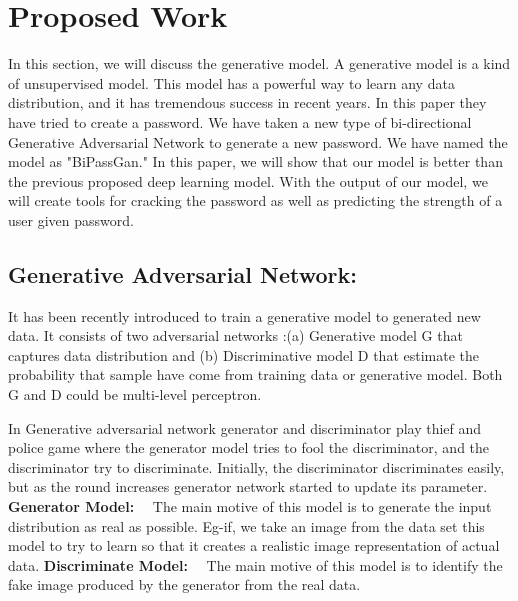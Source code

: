 \documentclass[runningheads]{llncs}
\begin{document}
\section{Proposed Work}
\newline
In this section, we will discuss the generative model. A generative model is a kind of unsupervised model. This model has a powerful way to learn any data distribution, and it has tremendous success in recent years. In this paper \cite{goodfellow2014generative} they have tried to create a password. We have taken a new type of bi-directional Generative Adversarial Network to generate a new password. We have named the model as "BiPassGan." In this paper, we will show that our model is better than the previous proposed deep learning model. With the output of our model, we will create tools for cracking the password as well as predicting the strength of a user given password.

\subsection{Generative Adversarial Network:} It has been recently introduced to train a generative model to generated new data. It consists of two adversarial networks :(a) Generative model G that captures data distribution and (b) Discriminative model D that estimate the probability that sample have come from training data or generative model. Both G and D could be multi-level perceptron. 

In Generative adversarial network generator and discriminator play thief and police game where the generator model tries to fool the discriminator, and the discriminator try to discriminate. Initially, the discriminator discriminates easily, but as the round increases generator network started to update its parameter.
\newline
\\
\textbf{Generator Model:}~~ The main motive of this model is to generate the input distribution as real as possible. Eg-if, we take an image from the data set this model to try to learn so that it creates a realistic image representation of actual data.
\newline
\textbf{Discriminate Model:}~~ The main motive of this model is to identify the fake image produced by the generator from the real data.
\newline
\hfill \break
\end{document}
